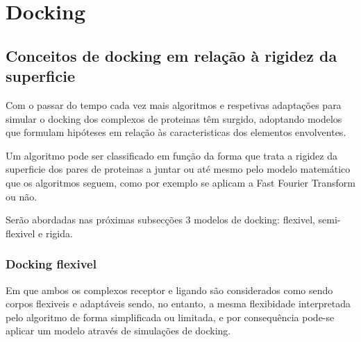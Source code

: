 %


\section{Docking}
\subsection{Conceitos de docking em relação à rigidez da superficie}
\label{classi}
Com o passar do tempo cada vez mais algoritmos e respetivas adaptações para simular o docking dos complexos de proteinas têm surgido, adoptando modelos que formulam hipóteses em relação às caracteristicas dos elementos envolventes. 

Um algoritmo pode ser classificado em função da forma que trata a rigidez  da superficie dos pares de proteinas a juntar ou até mesmo pelo modelo matemático que os algoritmos seguem, como por exemplo se aplicam a Fast Fourier Transform ou não.

Serão abordadas nas próximas subsecções 3 modelos de docking: flexivel, semi-flexivel e rigida. 



	\subsubsection{Docking flexivel} Em que ambos os complexos receptor e ligando são considerados como sendo corpos flexiveis e adaptáveis sendo, no entanto, a mesma flexibidade interpretada pelo algoritmo de forma simplificada ou limitada, e por consequência pode-se aplicar um modelo através de simulações de docking.

